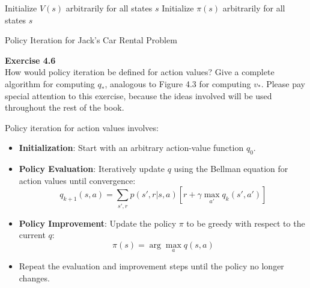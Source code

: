 \documentclass[addpoints]{exam}
\begin{document}
\begin{questions}
\begin{solution}
\begin{algorithm}[H]
    Initialize \( V(s) \) arbitrarily for all states \( s \)\;
    Initialize \( \pi(s) \) arbitrarily for all states \( s \)\;
    \caption{Policy Iteration for Jack's Car Rental Problem}
\end{algorithm}
    \end{solution}


    \question
    \textbf{Exercise 4.6} \\ How would policy iteration be defined for action values? Give a complete algorithm for computing \(q_{*}\), analogous to Figure 4.3 for computing \(v_{*}\). Please pay special attention to this exercise, because the ideas involved will be used throughout the rest of the book.
    \begin{solution}
        Policy iteration for action values involves:
        \begin{itemize}
            \item \textbf{Initialization}: Start with an arbitrary action-value function \( q_0 \).
            \item \textbf{Policy Evaluation}: Iteratively update \( q \) using the Bellman equation for action values until convergence:
            \[
            q_{k+1}(s, a) = \sum_{s', r} p(s', r | s, a) \left[ r + \gamma \max_{a'} q_{k}(s', a') \right]
            \]
            \item \textbf{Policy Improvement}: Update the policy \( \pi \) to be greedy with respect to the current \( q \):
            \[
            \pi(s) = \arg\max_{a} q(s, a)
            \]
            \item Repeat the evaluation and improvement steps until the policy no longer changes.
        \end{itemize}
    \end{solution}


\end{questions}
\end{document}
